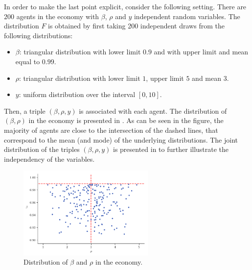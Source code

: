 \documentclass[english, a4paper, 12pt]{article}
\begin{document}
In order to make the last point explicit, consider the following setting. There are $200$ agents in the economy with $\beta$, $\rho$ and $y$ independent random variables. The distribution $F$ is obtained by first taking 200 independent draws from the following distributions:
	\begin{itemize}
		\item $\beta$: triangular distribution with lower limit $0.9$ and with upper limit and mean equal to $0.99$.
		\item $\rho$: triangular distribution with lower limit $1$, upper limit $5$ and mean $3$.
		\item $y$: uniform distribution over the interval $[0,10]$. 
	\end{itemize}

Then, a triple $(\beta,\rho,y)$ is associated with each agent. The distribution of $(\beta,\rho)$ in the economy is presented in . As can be seen in the figure, the majority of agents are close to the intersection of the dashed lines, that correspond to the mean (and mode) of the underlying distributions. The joint distribution of the triples $(\beta,\rho,y)$ is presented in  to further illustrate the independency of the variables.
	\begin{figure}[H]
		\caption{Distribution of $\beta$ and $\rho$ in the economy.}
		\label{fig:distribBetaRho}
		\includegraphics[width=0.6\textwidth]{CarrollDistrib}
	\end{figure}
\end{document}
